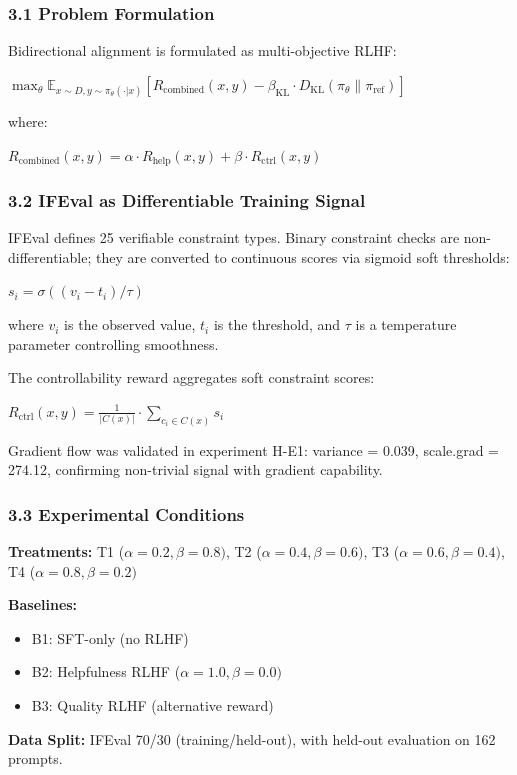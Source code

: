 
\subsubsection{3.1 Problem Formulation}

Bidirectional alignment is formulated as multi-objective RLHF:

$\max_\theta \mathbb{E}_{x \sim D, y \sim \pi_\theta(\cdot|x)} [R_{\text{combined}}(x, y) - \beta_{\text{KL}} \cdot D_{\text{KL}}(\pi_\theta \| \pi_{\text{ref}})]$

where:

$R_{\text{combined}}(x, y) = \alpha \cdot R_{\text{help}}(x, y) + \beta \cdot R_{\text{ctrl}}(x, y)$

\subsubsection{3.2 IFEval as Differentiable Training Signal}

IFEval defines 25 verifiable constraint types. Binary constraint checks are non-differentiable; they are converted to continuous scores via sigmoid soft thresholds:

$s_i = \sigma((v_i - t_i) / \tau)$

where $v_i$ is the observed value, $t_i$ is the threshold, and $\tau$ is a temperature parameter controlling smoothness.

The controllability reward aggregates soft constraint scores:

$R_{\text{ctrl}}(x, y) = \frac{1}{|C(x)|} \cdot \sum_{c_i \in C(x)} s_i$

Gradient flow was validated in experiment H-E1: variance = 0.039, scale.grad = 274.12, confirming non-trivial signal with gradient capability.

\subsubsection{3.3 Experimental Conditions}

\textbf{Treatments:} T1 ($\alpha =0.2, \beta =0.8)$, T2 ($\alpha =0.4, \beta =0.6)$, T3 ($\alpha =0.6, \beta =0.4)$, T4 ($\alpha =0.8, \beta =0.2)$

\textbf{Baselines:}
\begin{itemize}
\item B1: SFT-only (no RLHF)
\item B2: Helpfulness RLHF ($\alpha =1.0, \beta =0.0)$
\item B3: Quality RLHF (alternative reward)
\end{itemize}

\textbf{Data Split:} IFEval 70/30 (training/held-out), with held-out evaluation on 162 prompts.
